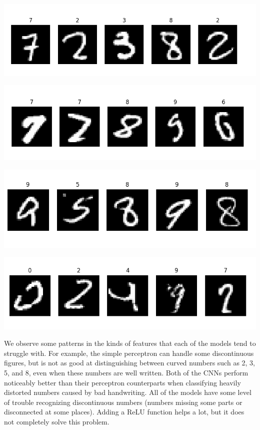 \documentclass[11pt]{amsart}
\begin{document}
\hspace{-0.3in}
\begin{minipage}{0.52\linewidth}
\includegraphics[width = \linewidth]{A1.png}
\end{minipage}
\begin{minipage}{0.52\linewidth}
\includegraphics[width = \linewidth]{B1.png}
\end{minipage}

\hspace{-0.3in}
\begin{minipage}{0.52\linewidth}
\includegraphics[width = \linewidth]{C1.png}
\end{minipage}
\begin{minipage}{0.52\linewidth}
\includegraphics[width = \linewidth]{D1.png}
\end{minipage}

We observe some patterns in the kinds of features that each of the models tend to struggle with. For example, the simple perceptron can handle some discontinuous figures, but is not as good at distinguishing between curved numbers such as 2, 3, 5, and 8, even when these numbers are well written. Both of the CNNs perform noticeably better than their perceptron counterparts when classifying heavily distorted numbers caused by bad handwriting. All of the models have some level of trouble recognizing discontinuous numbers (numbers missing some parts or disconnected at some places). Adding a ReLU function helps a lot, but it does not completely solve this problem.
\end{document}
